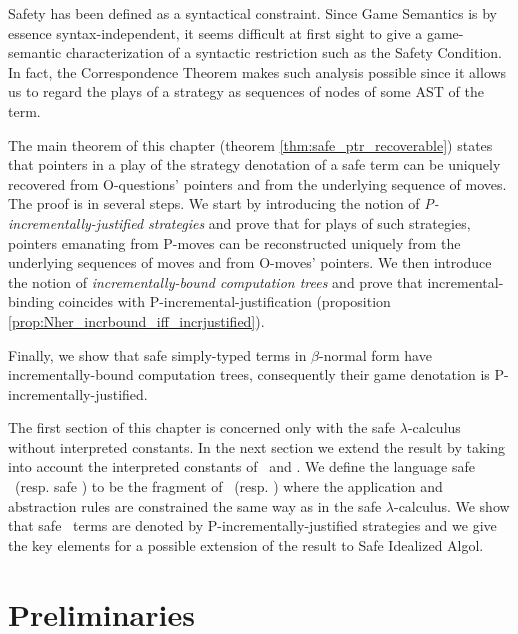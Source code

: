 

Safety has been defined as a syntactical constraint. Since Game
Semantics is by essence syntax-independent, it seems difficult at
first sight to give a game-semantic characterization of a syntactic restriction such as the Safety Condition.
In fact, the Correspondence Theorem makes such analysis possible since it allows us to regard the plays of a strategy
as sequences of nodes of some AST of the term.


The main theorem of this chapter (theorem
\ref{thm:safe_ptr_recoverable}) states that pointers in a play of
the strategy denotation of a safe term can be uniquely recovered
from O-questions' pointers and from the underlying sequence of
moves. The proof is in several steps. We start by introducing the
notion of \emph{P-incrementally-justified strategies} and prove that
for plays of such strategies, pointers emanating from P-moves can be
reconstructed uniquely from the underlying sequences of moves and
from O-moves' pointers. We then introduce the notion of
\emph{incrementally-bound computation trees} and prove that
incremental-binding coincides with P-incremental-justification
(proposition \ref{prop:Nher_incrbound_iff_incrjustified}).


Finally, we show that safe simply-typed terms in $\beta$-normal form
have incrementally\--bound computation trees, consequently their
game denotation is P-incrementally-justified.


The first section of this chapter is concerned only with the safe $\lambda$-calculus without interpreted constants. In the next
section we extend the result by taking into account the interpreted
constants of \pcf\ and \ialgol. We define the language safe \ialgol\
(resp. safe \pcf) to be the fragment of \ialgol\ (resp. \pcf) where
the application and abstraction rules are constrained the same way
as in the safe $\lambda$-calculus. We show that safe \pcf\ terms are
denoted by P-incrementally-justified strategies and we give the key
elements for a possible extension of the result to Safe Idealized
Algol.

\section{Preliminaries}

